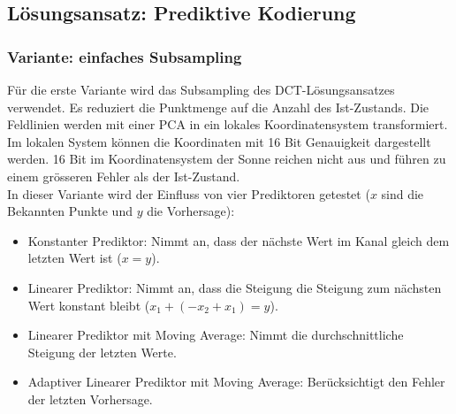 \subsection{Lösungsansatz: Prediktive Kodierung}

\subsubsection{Variante: einfaches Subsampling}
Für die erste Variante wird das Subsampling des DCT-Lösungsansatzes verwendet. Es reduziert die Punktmenge auf die Anzahl des Ist-Zustands. Die Feldlinien werden mit einer PCA in ein lokales Koordinatensystem transformiert. Im lokalen System können die Koordinaten mit 16 Bit Genauigkeit dargestellt werden. 16 Bit im Koordinatensystem der Sonne reichen nicht aus und führen zu einem grösseren Fehler als der Ist-Zustand.\\
In dieser Variante wird der Einfluss von vier Prediktoren getestet ($x$ sind die Bekannten Punkte und $y$ die Vorhersage):
\begin{itemize}
\item Konstanter Prediktor: Nimmt an, dass der nächste Wert im Kanal gleich dem  letzten Wert ist ($x = y$).
\item Linearer Prediktor: Nimmt an, dass die Steigung die Steigung zum nächsten Wert konstant bleibt ($x_1+(-x_2+x_1) = y$).
\item Linearer Prediktor mit Moving Average: Nimmt die durchschnittliche Steigung der letzten Werte.
\item Adaptiver Linearer Prediktor mit Moving Average: Berücksichtigt den Fehler der letzten Vorhersage.
\end{itemize}

